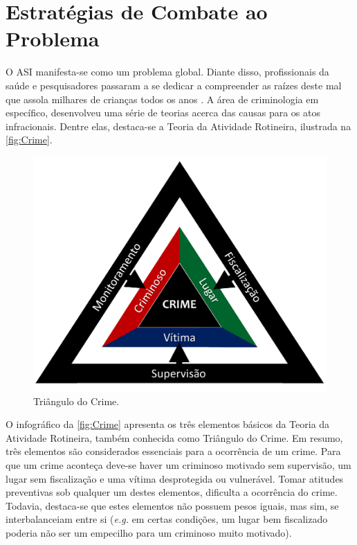 \chapter{Estratégias de Combate ao Problema}\label{ch:Relacionados}

O \acf{ASI} manifesta-se como um problema global. Diante disso, profissionais da saúde e pesquisadores passaram a se dedicar a compreender as raízes deste mal que assola milhares de crianças todos os anos \cite{deslandes1994atenccao, dahlberg2006violencia, hora2017violencia}. A área de criminologia em específico, desenvolveu uma série de teorias acerca das causas para os atos infracionais. Dentre elas, destaca-se a Teoria da Atividade Rotineira, ilustrada na \autoref{fig:Crime}.

\begin{figure}
  \vspace{-0.6cm}\caption{\label{fig:Crime}Triângulo do Crime.}
        \begin{center}
          \includegraphics[width=\linewidth]{./Visuais/TrianguloCrime.pdf}
        \end{center}
\end{figure}

O infográfico da \autoref{fig:Crime} apresenta os três elementos básicos da Teoria da Atividade Rotineira, também conhecida como Triângulo do Crime. Em resumo, três elementos são considerados essenciais para a ocorrência de um crime. Para que um crime aconteça deve-se haver um criminoso motivado sem supervisão, um lugar sem fiscalização e uma vítima desprotegida ou vulnerável. Tomar atitudes preventivas sob qualquer um destes elementos, dificulta a ocorrência do crime. Todavia, destaca-se que estes elementos não possuem pesos iguais, mas sim, se interbalanceiam entre si (\textit{e.g.} em certas condições, um lugar bem fiscalizado poderia não ser um empecilho para um criminoso muito motivado).

